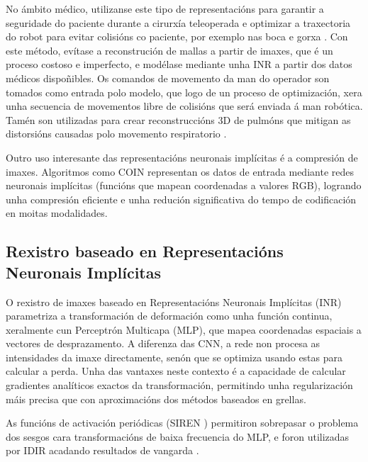 No ámbito médico, utilizanse este tipo de representacións para garantir a seguridade do paciente durante a cirurxía teleoperada e optimizar a traxectoria do robot para evitar colisións co paciente, por exemplo nas boca e gorxa \cite{teleoperatdrob}.
Con este método, evítase a reconstrución de mallas a partir de imaxes, que é un proceso costoso e imperfecto, e modélase mediante unha INR a partir dos datos médicos dispoñibles.
Os comandos de movemento da man do operador son tomados como entrada polo modelo, que logo de un proceso de optimización, xera unha secuencia de movementos libre de colisións que será enviada á man robótica.
Tamén son utilizadas para crear reconstruccións 3D de pulmóns que mitigan as distorsións causadas polo movemento respiratorio \cite{velikova2024implicitneuralrepresentationsbreathingcompensated}.

Outro uso interesante das representacións neuronais implícitas é a compresión de imaxes. Algoritmos como COIN \cite{coin} representan os datos de entrada mediante redes neuronais implícitas (funcións que mapean coordenadas a valores RGB), logrando unha compresión eficiente e unha redución significativa do tempo de codificación en moitas modalidades.

\subsection{Rexistro baseado en Representacións Neuronais Implícitas}
\label{subsec:Rexistro_baseado_en_INRs}

O rexistro de imaxes baseado en Representacións Neuronais Implícitas (INR) parametriza a transformación de deformación como unha función continua, xeralmente cun Perceptrón Multicapa (MLP), que mapea coordenadas espaciais a vectores de desprazamento. A diferenza das CNN, a rede non procesa as intensidades da imaxe directamente, senón que se optimiza usando estas para calcular a perda. Unha das vantaxes neste contexto é a capacidade de calcular gradientes analíticos exactos da transformación, permitindo unha regularización máis precisa que con aproximacións dos métodos baseados en grellas.  

As funcións de activación periódicas (SIREN \cite{sitzmann2020implicitneuralrepresentationsperiodic}) permitiron sobrepasar o problema dos sesgos cara transformacións de baixa frecuencia do MLP, e foron utilizadas por IDIR acadando resultados de vangarda \cite{wolterink2021implicit}.  

